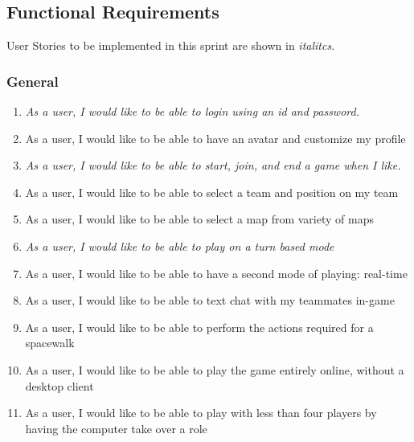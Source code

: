 \subsection*{Functional Requirements}

\hspace*{6mm} User Stories to be implemented in this sprint are shown in \textit{italitcs}. 

\subsubsection*{General}
\begin{enumerate}[leftmargin=\listmargin]
\item \textit{As a user, I would like to be able to login using an id and password.}
\item As a user, I would like to be able to have an avatar and customize my profile
\item \textit{As a user, I would like to be able to start, join, and end a game when I like.}
\item As a user, I would like to be able to select a team and position on my team
\item As a user, I would like to be able to select a map from variety of maps
\item \textit{As a user, I would like to be able to play on a turn based mode}
\item As a user, I would like to be able to have a second mode of playing: real-time
\item As a user, I would like to be able to text chat with my teammates in-game
\item As a user, I would like to be able to perform the actions required for a spacewalk
\item As a user, I would like to be able to play the game entirely online, without a desktop client
\item As a user, I would like to be able to play with less than four players by having the computer take over a role
\end{enumerate}
